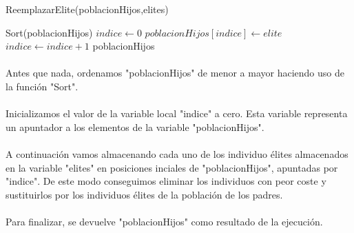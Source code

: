 	\begin{algorithm}[H]
		\caption{ReemplazarElite(poblacionHijos,elites)}
		\begin{algorithmic}
			\STATE Sort(poblacionHijos)
			\STATE $indice \leftarrow 0$
			\STATE $poblacionHijos[indice] \leftarrow elite$
			\STATE $indice \leftarrow indice+1$
			\ENDFOR
			\RETURN poblacionHijos
		\end{algorithmic}
	\end{algorithm}

	\paragraph{}Antes que nada, ordenamos "poblacionHijos" de menor a mayor haciendo uso de la función "Sort".
	
	\paragraph{}Inicializamos el valor de la variable local "indice" a cero. Esta variable representa un apuntador a los elementos de la variable "poblacionHijos".
	
	\paragraph{}A continuación vamos almacenando cada uno de los individuo élites almacenados en la variable "elites" en posiciones inciales de "poblacionHijos", apuntadas por "indice". De este modo conseguimos eliminar los individuos con peor coste y sustituirlos por los individuos élites de la población de los padres.
	
	\paragraph{}Para finalizar, se devuelve "poblacionHijos" como resultado de la ejecución.
	
	\newpage
	